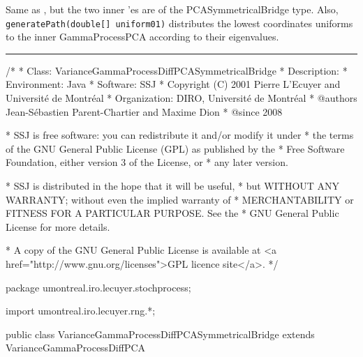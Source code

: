 
Same as , but the two
inner 'es are of the PCASymmetricalBridge type.
Also, \texttt{generatePath(double[] uniform01)} distributes the
lowest coordinates uniforms to the inner
GammaProcessPCA according to their eigenvalues.

\bigskip\hrule\bigskip

\begin{code}
\begin{hide}
/*
 * Class:        VarianceGammaProcessDiffPCASymmetricalBridge
 * Description:  
 * Environment:  Java
 * Software:     SSJ 
 * Copyright (C) 2001  Pierre L'Ecuyer and Université de Montréal
 * Organization: DIRO, Université de Montréal
 * @authors       Jean-Sébastien Parent-Chartier and Maxime Dion 
 * @since        2008

 * SSJ is free software: you can redistribute it and/or modify it under
 * the terms of the GNU General Public License (GPL) as published by the
 * Free Software Foundation, either version 3 of the License, or
 * any later version.

 * SSJ is distributed in the hope that it will be useful,
 * but WITHOUT ANY WARRANTY; without even the implied warranty of
 * MERCHANTABILITY or FITNESS FOR A PARTICULAR PURPOSE.  See the
 * GNU General Public License for more details.

 * A copy of the GNU General Public License is available at
   <a href="http://www.gnu.org/licenses">GPL licence site</a>.
 */
\end{hide}
package umontreal.iro.lecuyer.stochprocess;\begin{hide}
import umontreal.iro.lecuyer.rng.*;

\end{hide}

public class VarianceGammaProcessDiffPCASymmetricalBridge extends 
             VarianceGammaProcessDiffPCA \begin{hide} {



\end{hide}
\end{code}
